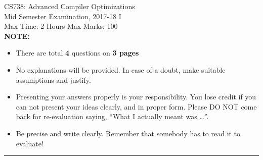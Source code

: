 \documentclass[12pt]{article}
\begin{document}
\begin{center}
CS738: Advanced Compiler Optimizations \\
Mid Semester Examination, 2017-18 I\\
Max Time: 2 Hours  \hfill Max Marks: {100} \\

{\bf NOTE: }
\begin{itemize}
\item There are total {\bf 4} questions on {\bf 3 pages}
\item No explanations will be provided. In case of a doubt, make
  suitable assumptions and justify.

\item Presenting your answers properly is your
  responsibility. You lose credit if you can not present your
  ideas clearly, and in proper form. Please DO NOT come back
  for re-evaluation saying, ``What I actually meant was
  \ldots''.

\item Be precise and write clearly. Remember that somebody
  has to read it to evaluate!

\end{itemize}
\hrule
\end{center}
\end{document}
